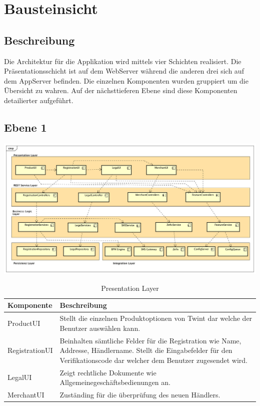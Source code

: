 \graphicspath{{./images/}}

\chapter{Bausteinsicht}

\section{Beschreibung}

Die Architektur für die Applikation wird mittels vier Schichten realisiert. Die Präsentationsschicht ist auf dem WebServer während die anderen drei sich auf dem AppServer befinden. Die einzelnen Komponenten wurden gruppiert um die Übersicht zu wahren. Auf der nächsttieferen Ebene sind diese Komponenten detailierter aufgeführt.

\begin{landscape}
\section{Ebene 1}

\begin{center}
	\includegraphics[scale=0.60]{ComponentLevel1.png}
\end{center}

\end{landscape}
\restoregeometry

\begin{table}[H]
	\centering
	\caption{Presentation Layer}
	\begin{tabular}{ | p{4cm} | p{12cm} | }
		\toprule
		{\textbf{Komponente}} & {\textbf{Beschreibung}} \\
		\midrule
		ProductUI &  Stellt die einzelnen Produktoptionen von Twint dar welche der Benutzer auswählen kann. \\ \hline
		RegistrationUI &  Beinhalten sämtliche Felder für die Registration wie Name, Addresse, Händlername. Stellt die Eingabefelder für den Verifikationscode dar welcher dem Benutzer zugesendet wird.\\ \hline
		LegalUI &  Zeigt rechtliche Dokumente wie Allgemeinegeschäftsbedienungen an. \\ \hline
		MerchantUI &  Zuständing für die überprüfung des neuen Händlers.\\
		\bottomrule
	\end{tabular}
\end{table}


